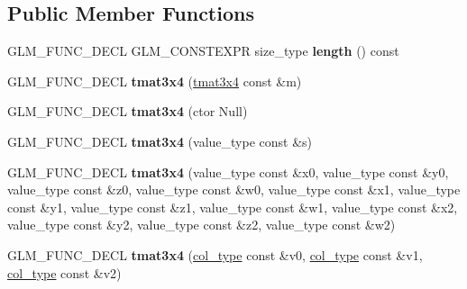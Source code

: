 \subsection*{Public Member Functions}
\begin{DoxyCompactItemize}
\item 
\hypertarget{structglm_1_1detail_1_1tmat3x4_a7d520f11723cd0828b9a8f66af715c5f}{}G\+L\+M\+\_\+\+F\+U\+N\+C\+\_\+\+D\+E\+C\+L G\+L\+M\+\_\+\+C\+O\+N\+S\+T\+E\+X\+P\+R size\+\_\+type {\bfseries length} () const \label{structglm_1_1detail_1_1tmat3x4_a7d520f11723cd0828b9a8f66af715c5f}

\item 
\hypertarget{structglm_1_1detail_1_1tmat3x4_a0fc4926d8a72adc932b36f0be3c924ee}{}G\+L\+M\+\_\+\+F\+U\+N\+C\+\_\+\+D\+E\+C\+L {\bfseries tmat3x4} (\hyperlink{structglm_1_1detail_1_1tmat3x4}{tmat3x4} const \&m)\label{structglm_1_1detail_1_1tmat3x4_a0fc4926d8a72adc932b36f0be3c924ee}

\item 
\hypertarget{structglm_1_1detail_1_1tmat3x4_ada4cb47bbe810d5327a994856d66ba38}{}G\+L\+M\+\_\+\+F\+U\+N\+C\+\_\+\+D\+E\+C\+L {\bfseries tmat3x4} (ctor Null)\label{structglm_1_1detail_1_1tmat3x4_ada4cb47bbe810d5327a994856d66ba38}

\item 
\hypertarget{structglm_1_1detail_1_1tmat3x4_ad79c02c5d9ba799ee50185a577cff941}{}G\+L\+M\+\_\+\+F\+U\+N\+C\+\_\+\+D\+E\+C\+L {\bfseries tmat3x4} (value\+\_\+type const \&s)\label{structglm_1_1detail_1_1tmat3x4_ad79c02c5d9ba799ee50185a577cff941}

\item 
\hypertarget{structglm_1_1detail_1_1tmat3x4_a163812d2dd1aeddf6f36bf5e7f9bec93}{}G\+L\+M\+\_\+\+F\+U\+N\+C\+\_\+\+D\+E\+C\+L {\bfseries tmat3x4} (value\+\_\+type const \&x0, value\+\_\+type const \&y0, value\+\_\+type const \&z0, value\+\_\+type const \&w0, value\+\_\+type const \&x1, value\+\_\+type const \&y1, value\+\_\+type const \&z1, value\+\_\+type const \&w1, value\+\_\+type const \&x2, value\+\_\+type const \&y2, value\+\_\+type const \&z2, value\+\_\+type const \&w2)\label{structglm_1_1detail_1_1tmat3x4_a163812d2dd1aeddf6f36bf5e7f9bec93}

\item 
\hypertarget{structglm_1_1detail_1_1tmat3x4_af4a8d8a9f6d1c5b61b7a77041fd3b04d}{}G\+L\+M\+\_\+\+F\+U\+N\+C\+\_\+\+D\+E\+C\+L {\bfseries tmat3x4} (\hyperlink{structglm_1_1detail_1_1tvec4}{col\+\_\+type} const \&v0, \hyperlink{structglm_1_1detail_1_1tvec4}{col\+\_\+type} const \&v1, \hyperlink{structglm_1_1detail_1_1tvec4}{col\+\_\+type} const \&v2)\label{structglm_1_1detail_1_1tmat3x4_af4a8d8a9f6d1c5b61b7a77041fd3b04d}


\end{DoxyCompactItemize}
